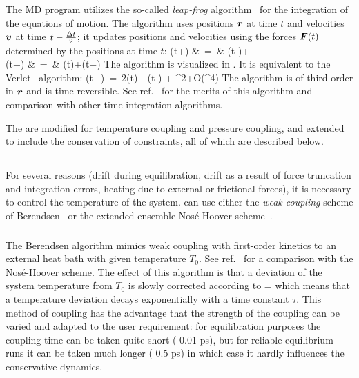 The {\gromacs} MD program utilizes the so-called {\em leap-frog} 
algorithm~\cite{Hockney74} for the integration of the equations of
motion.  The  
algorithm uses positions $\mbox{\boldmath ${r}$}$ at time $t$ and
velocities $\mbox{\boldmath ${v}$}$ at time $t-{\frac {\Delta t}{2}}$; it updates positions and
velocities using the forces
$\mbox{\boldmath ${F}$}(t)$ determined by the positions at time $t$: 
\bea
{}(t+\hDt)  &~=~&   (t-\hDt)+\Dt   \\
(t+\Dt)   &~=~&   (t)+(t+\hDt)\Dt
\eea
The algorithm is visualized in .
It is equivalent to the Verlet~\cite{Verlet67} algorithm:
\beq
{}(t+\Dt)~=~2(t) - (t-\Dt) + \Dt^2+O(\Dt^4)
\eeq
The algorithm is of third order in $\mbox{\boldmath ${r}$}$ and is time-reversible.
See ref.~\cite{Berendsen86b} for the merits of this algorithm and comparison
with other time integration algorithms.
 
The  are modified for temperature coupling
 and pressure coupling, and extended to include the conservation of
constraints, all of which are described below.

\subsection{}
For several reasons (drift during equilibration, drift as a result of
force truncation and integration errors, heating due to external or
frictional forces), it is necessary to control the temperature of the
system. {\gromacs} can use either
the {\em weak coupling} scheme of Berendsen~\cite{Berendsen84} or
the extended ensemble Nos{\'e}-Hoover scheme~\cite{Nose84,Hoover85}.

\subsubsection{}
The Berendsen algorithm mimics weak coupling with first-order 
kinetics to an external heat bath with given temperature $T_0$. 
See ref.~\cite{Berendsen91} for a comparison with the
Nos{\'e}-Hoover scheme. The effect of this algorithm is
that a deviation of the system temperature from $T_0$ is slowly
corrected according to
\beq
{} = 
\label{eqn:Tcoupling}
\eeq
which means that a temperature deviation decays exponentially with a
time constant $\tau$.
This method of coupling has the advantage that the strength of the
coupling can be varied and adapted to the user requirement: for
equilibration purposes the coupling time can be taken quite short
({\eg} 0.01 ps), but for reliable equilibrium runs it can be taken much
longer ({\eg} 0.5 ps) in which case it hardly influences the
conservative dynamics. 
 
